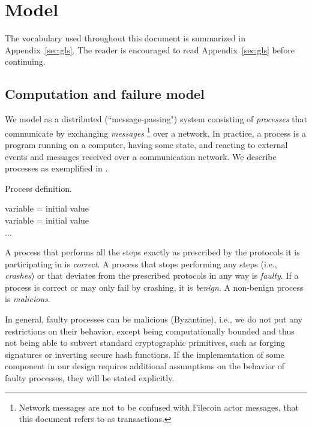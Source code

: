 \section{Model}
\label{sec:model}

The vocabulary used throughout this document is summarized in Appendix~\ref{sec:gls}. The reader is encouraged to read Appendix~\ref{sec:gls} before continuing.

\subsection{Computation and failure model}

We model \ipc as a distributed (``message-passing") system consisting of \emph{processes} that communicate by exchanging \emph{messages}%
\footnote{Network messages are not to be confused with Filecoin actor messages, that this document refers to as transactions.}
over a network. 
In practice, a process is a program running on a computer, having some state, and reacting to external events and messages received over a communication network.
We describe processes as exemplified in .

\begin{algorithm}[H]
\footnotesize
\caption{Process definition.}\label{alg:process-definition}
  \DontPrintSemicolon
  variable = initial value\\
  variable = initial value\\
  ...\\
\end{algorithm}

A process that performs all the steps exactly as prescribed by the protocols it is participating in is \emph{correct}.
A process that stops performing any steps (i.e., \emph{crashes}) or that deviates from the prescribed protocols in any way is \emph{faulty}.
If a process is correct or may only fail by crashing, it is \emph{benign}.
A non-benign process is \emph{malicious}.

In general, faulty processes can be malicious (Byzantine), i.e., we do not put any restrictions on their behavior, except being computationally bounded and thus not being able to subvert standard cryptographic primitives, such as forging signatures or inverting secure hash functions.
If the implementation of some component in our design requires additional assumptions on the behavior of faulty processes, they will be stated explicitly.

